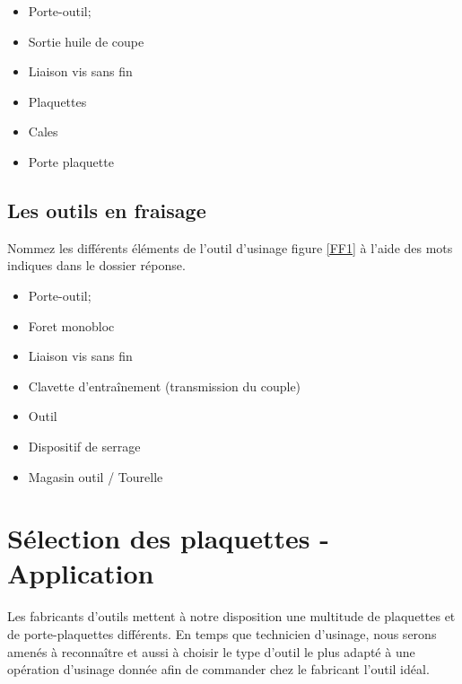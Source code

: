 \documentclass[12pt]{article}
\newcounter{exo}
\newenvironment{exo}{\stepcounter{exo}\vspace{0.5cm}{\bfseries Question \theexo\ :}}{\par\vspace{0.5cm}}
\begin{document}
\begin{minipage}{.55\linewidth}
\begin{itemize}
    \item Porte-outil;
    \item Sortie huile de coupe
    \item Liaison vis sans fin
\end{itemize} 
\end{minipage}
\begin{minipage}{.44\linewidth}
\begin{itemize}
    \item Plaquettes
    \item Cales
    \item Porte plaquette
\end{itemize} 
\end{minipage}




\subsection{Les outils en fraisage}


\begin{exo} Nommez les différents éléments de l’outil d’usinage figure \ref{FF1} à l'aide des mots
indiques dans le dossier réponse. \end{exo}



\begin{minipage}{.55\linewidth}
\begin{itemize}
    \item Porte-outil;
    \item Foret monobloc
    \item Liaison vis sans fin
    \item Clavette d'entraînement (transmission du couple)
\end{itemize} 
\end{minipage}
\begin{minipage}{.44\linewidth}
\begin{itemize}
    \item Outil
    \item Dispositif de serrage
    \item Magasin outil / Tourelle
\end{itemize} 
\end{minipage}


\section{Sélection des plaquettes - Application}
Les fabricants d’outils mettent à notre disposition une multitude de plaquettes et de porte-plaquettes différents. En temps que technicien d’usinage, nous serons amenés à reconnaître et aussi à choisir le type d’outil le plus adapté à une opération d’usinage donnée afin de commander chez le fabricant l’outil idéal.
\end{document}
